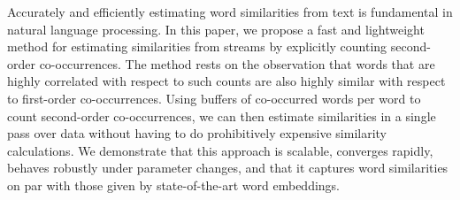 Accurately and efficiently estimating word similarities from text is fundamental in natural language processing. In this paper, we propose a fast and lightweight method for estimating similarities from streams by explicitly counting second-order co-occurrences. The method rests on the observation that words that are highly correlated with respect to such counts are also highly similar with respect to first-order co-occurrences. Using buffers of co-occurred words per word to count second-order co-occurrences, we can then estimate similarities in a single pass over data without having to do prohibitively expensive similarity calculations. We demonstrate that this approach is scalable, converges rapidly, behaves robustly under parameter changes, and that it captures word similarities on par with those given by state-of-the-art word embeddings.
